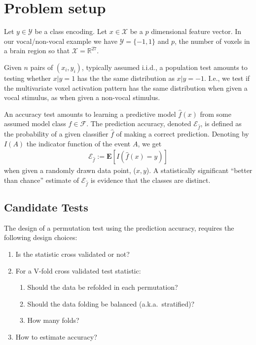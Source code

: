 \documentclass[12pt,a4paper]{article}
\theoremstyle{definition}
\newcommand{\set}[1]{\{ #1 \}} %
\newcommand{\reals}{\mathbb{R}} %
\newcommand{\features}{x} %
\newcommand{\outcomes}{y} %
\newcommand{\featureS}{\mathcal{X}} %
\newcommand{\outcomeS}{\mathcal{Y}} %
\newcommand{\hyp}{f} %
\newcommand{\hypEstim}{\hat{\hyp}} %
\newcommand{\hypclass}{\mathcal{F}}
\newcommand{\expect}[1]{\mathbf{E}\left[ #1 \right]} %
\newcommand{\acc}{\mathcal{E}}
\begin{document}
\section{Problem setup}
\label{sec:problem_setup}

Let $\outcomes \in \outcomeS$ be a class encoding. 
Let $\features \in \featureS$ be a $p$ dimensional feature vector. 
In our vocal/non-vocal example we have $\outcomeS=\set{-1,1}$ and $p$, the number of voxels in a brain region so that $\featureS=\reals^{27}$. 

Given $n$ pairs of $(\features_i,\outcomes_i)$, typically assumed i.i.d., a population test amounts to testing whether $\features|\outcomes=1$ has the the same distribution as $\features|\outcomes=-1$. 
I.e., we test if the multivariate voxel activation pattern has the same distribution when given a vocal stimulus, as when given a non-vocal stimulus. 

An accuracy test amounts to learning a predictive model $\hypEstim(\features)$ from some assumed model class $\hypEstim \in \hypclass$. 
The prediction accuracy, denoted $\acc_{\hypEstim}$, is defined as the probability of a given classifier $\hypEstim$ of making a correct prediction.
Denoting by $I(A)$ the indicator function of the event $A$, we get
\begin{align}
	\acc_{\hypEstim}:=\expect{I(\hypEstim(x)=y)}
\end{align}
when given a randomly drawn data point, ($\features,\outcomes$). 
A statistically significant ``better than chance'' estimate of $\acc_{\hypEstim}$ is evidence that the classes are distinct. 


\subsection{Candidate Tests}
\label{sec:considerations}

The design of a permutation test using the prediction accuracy, requires the following design choices: 
\begin{enumerate}
\item Is the statistic cross validated or not?
\item For a V-fold cross validated test statistic:
\begin{enumerate}
\item Should the data be refolded in each permutation? 
\item Should the data folding be balanced (a.k.a.\ stratified)?
\item How many folds? 
\end{enumerate}
\item How to estimate accuracy?
\end{enumerate}
\end{document}
